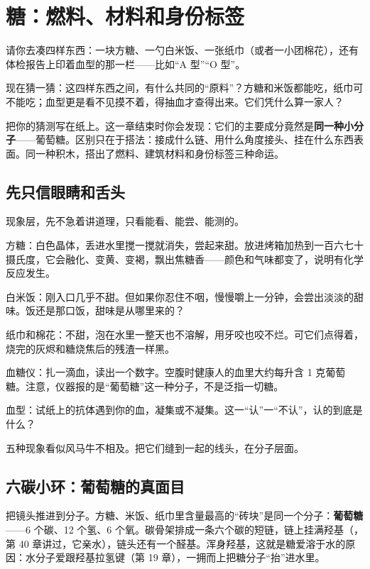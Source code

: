 \chapter{糖：燃料、材料和身份标签}

\begin{kaichang}
请你去凑四样东西：一块方糖、一勺白米饭、一张纸巾（或者一小团棉花），还有体检报告上印着血型的那一栏——比如“A 型”“O 型”。

现在猜一猜：这四样东西之间，有什么共同的“原料”？方糖和米饭都能吃，纸巾可不能吃；血型更是看不见摸不着，得抽血才查得出来。它们凭什么算一家人？

把你的猜测写在纸上。这一章结束时你会发现：它们的主要成分竟然是\textbf{同一种小分子}——葡萄糖。区别只在于搭法：接成什么链、用什么角度接头、挂在什么东西表面。同一种积木，搭出了燃料、建筑材料和身份标签三种命运。
\end{kaichang}

\section{先只信眼睛和舌头}

现象层，先不急着讲道理，只看能看、能尝、能测的。

方糖：白色晶体，丢进水里搅一搅就消失，尝起来甜。放进烤箱加热到一百六七十摄氏度，它会融化、变黄、变褐，飘出焦糖香——颜色和气味都变了，说明有化学反应发生。

白米饭：刚入口几乎不甜。但如果你忍住不咽，慢慢嚼上一分钟，会尝出淡淡的甜味。饭还是那口饭，甜味是从哪里来的？

纸巾和棉花：不甜，泡在水里一整天也不溶解，用牙咬也咬不烂。可它们点得着，烧完的灰烬和糖烧焦后的残渣一样黑。

血糖仪：扎一滴血，读出一个数字。空腹时健康人的血里大约每升含 1 克葡萄糖。注意，仪器报的是“葡萄糖”这一种分子，不是泛指一切糖。

血型：试纸上的抗体遇到你的血，凝集或不凝集。这一“认”一“不认”，认的到底是什么？

五种现象看似风马牛不相及。把它们缝到一起的线头，在分子层面。

\section{六碳小环：葡萄糖的真面目}

把镜头推进到分子。方糖、米饭、纸巾里含量最高的“砖块”是同一个分子：\textbf{葡萄糖}——6 个碳、12 个氢、6 个氧。碳骨架排成一条六个碳的短链，链上挂满羟基（，第 40 章讲过，它亲水），链头还有一个醛基。浑身羟基，这就是糖爱溶于水的原因：水分子爱跟羟基拉氢键（第 19 章），一拥而上把糖分子“抬”进水里。

